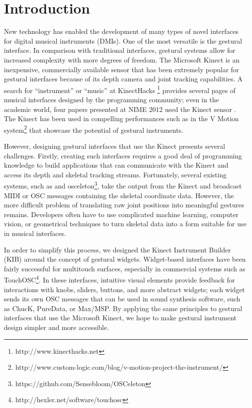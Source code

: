 \documentclass{nime-alternate}
\begin{document}
\section{Introduction}
New technology has enabled the development of many types of novel interfaces for digital
musical instruments (DMIs). One of the most versatile is the gestural interface. In comparison
with traditional interfaces, gestural systems allow for increased complexity with more degrees
of freedom. The Microsoft Kinect is an inexpensive, commercially available sensor that has been
extremely popular for gestural interfaces because of its depth camera and joint tracking
capabilities. A search for ``instrument'' or ``music'' at KinectHacks
\footnote{http://www.kinecthacks.net} provides
several pages of musical interfaces designed by the programming community; even in the
academic world, four papers presented at NIME 2012 used the Kinect sensor \cite{nimekinect1, nimekinect2, nimekinect3, digito}. The Kinect has been used in compelling performances
such as in the V Motion system\footnote{http://www.custom-logic.com/blog/v-motion-project-the-instrument/} that showcase the potential of gestural instruments.

However, designing gestural interfaces that use the Kinect presents several challenges. 
Firstly, creating such interfaces requires a good deal of programming knowledge to build
applications that can communicate with the Kinect and access its depth and skeletal tracking streams. 
Fortunately, several existing systems, such as \cite{yoo2011creating} and osceleton\footnote{https://github.com/Sensebloom/OSCeleton}, take the output from
the Kinect and broadcast MIDI or OSC messages containing the skeletal coordinate data. However,
the more difficult problem of translating raw joint positions into meaningful gestures remains.
Developers often have to use complicated machine learning, computer vision, or geometrical
techniques to turn skeletal data into a form suitable for use in musical interfaces. 

In order to simplify this process, we designed the Kinect Instrument Builder (KIB) around the
concept of gestural widgets. Widget-based interfaces have been fairly successful for multitouch
surfaces, especially in commercial systems such as TouchOSC\footnote{http://hexler.net/software/touchosc}. In these interfaces, intuitive visual elements provide feedback for interactions
with knobs, sliders, buttons, and more abstract widgets; each widget sends its own OSC messages
that can be used in sound synthesis software, such as ChucK, PureData, or Max/MSP. By applying
the same principles to gestural interfaces that use the Microsoft Kinect, we hope to make gestural
instrument design simpler and more accessible. 
\end{document}
